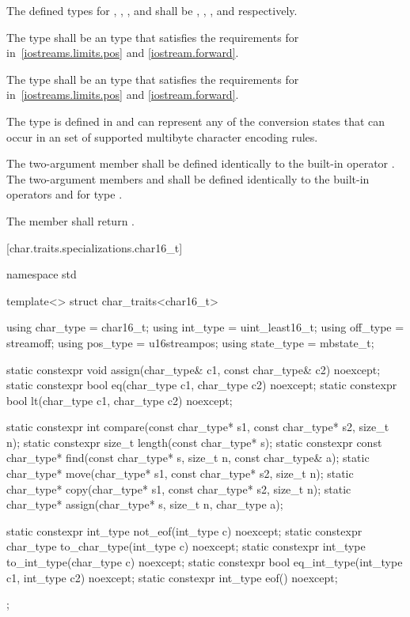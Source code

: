\pnum
The defined types for
,
,
,
and
shall be
,
,
,
and
respectively.

\pnum
The type
shall be an  type that satisfies the requirements for
in~\ref{iostreams.limits.pos} and \ref{iostream.forward}.

\pnum
The type
shall be an  type that satisfies the requirements for
in~\ref{iostreams.limits.pos} and \ref{iostream.forward}.

\pnum
The type
is defined in
and can represent any of the conversion states that can occur in an
 set of supported multibyte
character encoding rules.

\pnum
The two-argument member  shall be defined identically to the
built-in operator \tcode{=}. The two-argument members 
and  shall be defined identically to the built-in operators
\tcode{==} and \tcode{<} for type .

\pnum
The member
shall return
.

[char.traits.specializations.char16_t]{}

%
\begin{codeblock}
namespace std {
  template<> struct char_traits<char16_t> {
    using char_type  = char16_t;
    using int_type   = uint_least16_t;
    using off_type   = streamoff;
    using pos_type   = u16streampos;
    using state_type = mbstate_t;

    static constexpr void assign(char_type& c1, const char_type& c2) noexcept;
    static constexpr bool eq(char_type c1, char_type c2) noexcept;
    static constexpr bool lt(char_type c1, char_type c2) noexcept;

    static constexpr int compare(const char_type* s1, const char_type* s2, size_t n);
    static constexpr size_t length(const char_type* s);
    static constexpr const char_type* find(const char_type* s, size_t n,
                                           const char_type& a);
    static char_type* move(char_type* s1, const char_type* s2, size_t n);
    static char_type* copy(char_type* s1, const char_type* s2, size_t n);
    static char_type* assign(char_type* s, size_t n, char_type a);

    static constexpr int_type not_eof(int_type c) noexcept;
    static constexpr char_type to_char_type(int_type c) noexcept;
    static constexpr int_type to_int_type(char_type c) noexcept;
    static constexpr bool eq_int_type(int_type c1, int_type c2) noexcept;
    static constexpr int_type eof() noexcept;
  };
}
\end{codeblock}

